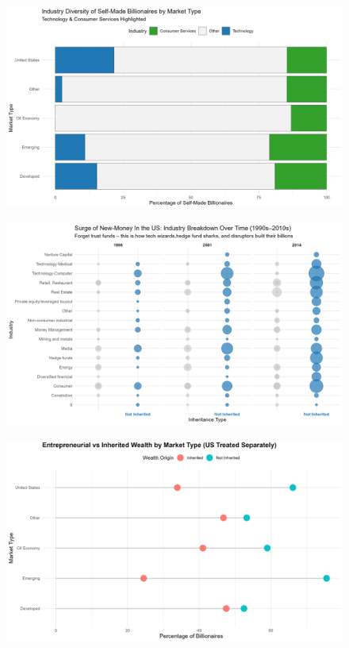 \documentclass[
  man,floatsintext]{apa6}
\begin{document}
\begin{figure}
\includegraphics[width=0.9\linewidth]{../Question4/Results/industrydominance} \caption{ }\label{fig:industrydominance-image}
\end{figure}

\begin{figure}
\includegraphics[width=0.9\linewidth]{../Question4/Results/bubble} \caption{ }\label{fig:bubbles}
\end{figure}

\begin{figure}
\includegraphics[width=0.9\linewidth]{../Question4/Results/wealthbyregion} \caption{ }\label{fig:wealthbyregion-image}
\end{figure}
\end{document}
